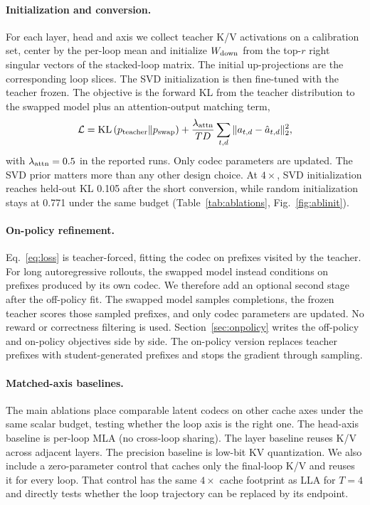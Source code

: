 \documentclass[10pt]{article}
\newcommand{\lla}{LLA}
\begin{document}
\paragraph{Initialization and conversion.}
For each layer, head and axis we collect teacher K/V activations on a calibration set, center by the per-loop mean and initialize $W_{\rm down}$ from the top-$r$ right singular vectors of the stacked-loop matrix. The initial up-projections are the corresponding loop slices. The SVD initialization is then fine-tuned with the teacher frozen. The objective is the forward KL from the teacher distribution to the swapped model plus an attention-output matching term,
\begin{equation}
  \mathcal{L} = \mathrm{KL}\left(p_{\rm teacher}\|p_{\rm swap}\right)
  + \frac{\lambda_{\rm attn}}{TD}\sum_{t,d}\|a_{t,d}-\hat a_{t,d}\|_2^2,
  \label{eq:loss}
\end{equation}
with $\lambda_{\rm attn}=0.5$ in the reported runs. Only codec parameters are updated. The SVD prior matters more than any other design choice. At $4\times$, SVD initialization reaches held-out KL 0.105 after the short conversion, while random initialization stays at 0.771 under the same budget (Table~\ref{tab:ablations}, Fig.~\ref{fig:ablinit}).

\paragraph{On-policy refinement.}
Eq.~\eqref{eq:loss} is teacher-forced, fitting the codec on prefixes visited by the teacher. For long autoregressive rollouts, the swapped model instead conditions on prefixes produced by its own codec. We therefore add an optional second stage after the off-policy fit. The swapped model samples completions, the frozen teacher scores those sampled prefixes, and only codec parameters are updated. No reward or correctness filtering is used. Section~\ref{sec:onpolicy} writes the off-policy and on-policy objectives side by side. The on-policy version replaces teacher prefixes with student-generated prefixes and stops the gradient through sampling.

\paragraph{Matched-axis baselines.}
The main ablations place comparable latent codecs on other cache axes under the same scalar budget, testing whether the loop axis is the right one. The head-axis baseline is per-loop MLA (no cross-loop sharing). The layer baseline reuses K/V across adjacent layers. The precision baseline is low-bit KV quantization. We also include a zero-parameter control that caches only the final-loop K/V and reuses it for every loop. That control has the same $4\times$ cache footprint as \lla{} for $T=4$ and directly tests whether the loop trajectory can be replaced by its endpoint.
\end{document}
